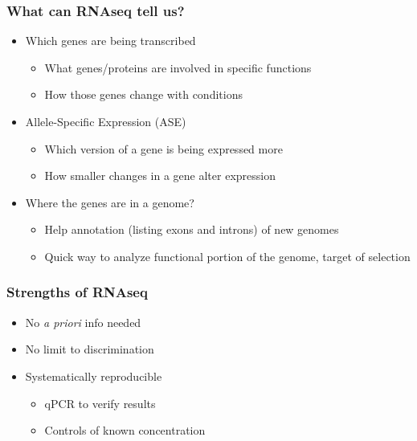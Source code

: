 \documentclass[14pt]{beamer}
\begin{document}
\begin{frame}
\frametitle{What can RNAseq tell us?}
	\begin{itemize}
		\item<+-> Which genes are being transcribed
		\begin{itemize}
			\item<+-> What genes/proteins are involved in specific functions
			\item<+-> How those genes change with conditions
		\end{itemize}
		\item<+-> Allele-Specific Expression (ASE)
		\begin{itemize}
			\item<+-> Which version of a gene is being expressed more
			\item<+-> How smaller changes in a gene alter expression
		\end{itemize}		
		\item<+-> Where the genes are in a genome?
		\begin{itemize}
			\item<+-> Help annotation (listing exons and introns) of new genomes
			\item<+-> Quick way to analyze functional portion of the genome, target of selection
		\end{itemize}
	\end{itemize}
\end{frame}

\begin{frame}
\frametitle{Strengths of RNAseq}
	\begin{itemize}
		\item<+-> No \textit{a priori} info needed
		\item<+-> No limit to discrimination
		\item<+-> Systematically reproducible
		\begin{itemize}
			\item<+-> qPCR to verify results
			\item<+-> Controls of known concentration
		\end{itemize}
	\end{itemize}
\end{frame}
\end{document}
